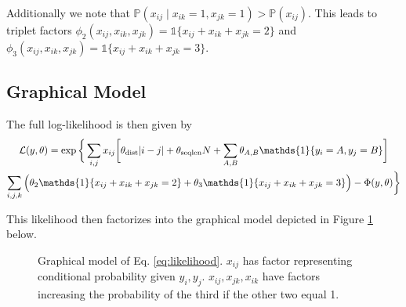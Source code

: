 \documentclass{article}
\begin{document}
Additionally we note that $\mathbb{P}(x_{ij} \mid x_{ik} = 1, x_{jk} = 1) > \mathbb{P}(x_{ij})$. This leads to triplet factors $\phi_2(x_{ij}, x_{ik}, x_{jk}) = \mathds{1}\{x_{ij} + x_{ik} + x_{jk} = 2\}$ and $\phi_3(x_{ij}, x_{ik}, x_{jk}) = \mathds{1}\{x_{ij} + x_{ik} + x_{jk} = 3\}$. 
\subsection{Graphical Model}
The full log-likelihood is then given by
\begin{multline} \label{eq:likelihood}
\mathcal{L}(y, \theta) = \exp\bigg\{\sum_{i, j} x_{ij}\bigg[\theta_{\textmd{dist}}|i - j|+ \theta_{\textmd{seqlen}}N + \sum_{A, B} \theta_{A, B}\mathds{1}\{y_i = A, y_j = B\}\bigg] \\
\sum_{i, j, k}\Big(\theta_2\mathds{1}\{x_{ij} + x_{ik} + x_{jk} = 2\} + \theta_3\mathds{1}\{x_{ij} + x_{ik} + x_{jk} = 3\}\Big)  - \Phi(y, \theta) \bigg\}
\end{multline}

This likelihood then factorizes into the graphical model depicted in Figure \ref{fig:model} below.
\begin{figure}
\centering
{}
\caption{Graphical model of Eq. \ref{eq:likelihood}. $x_{ij}$ has factor representing conditional probability given $y_i, y_j$. $x_{ij}, x_{jk}, x_{ik}$ have factors increasing the probability of the third if the other two equal 1.}
\label{fig:model}
\end{figure}
\end{document}
